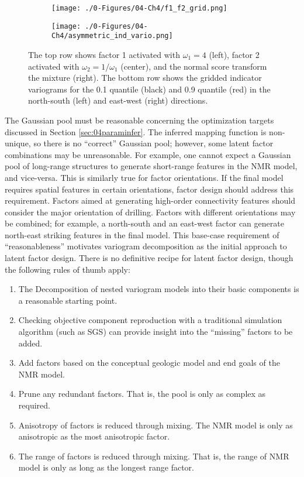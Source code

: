 \begin{figure}[!htb]
    \begin{subfigure}{1.0\textwidth}
        \centering
        \texttt{[image: ./0-Figures/04-Ch4/f1\_f2\_grid.png]}
    \end{subfigure}
    \begin{subfigure}{1.0\textwidth}
        \centering
        \texttt{[image: ./0-Figures/04-Ch4/asymmetric\_ind\_vario.png]}
    \end{subfigure}
    \caption{The top row shows factor 1 activated with $\omega_{1}=4$ (left), factor 2 activated with $\omega_{2}=1/\omega_{1}$ (center), and the normal score transform the mixture (right). The bottom row shows the gridded indicator variograms for the 0.1 quantile (black) and 0.9 quantile (red) in the north-south (left) and east-west (right) directions. }
    \label{fig:pool_asymmetry}
\end{figure}

The Gaussian pool must be reasonable concerning the optimization targets discussed in Section \ref{sec:04paraminfer}. The inferred mapping function is non-unique, so there is no ``correct'' Gaussian pool; however, some latent factor combinations may be unreasonable. For example, one cannot expect a Gaussian pool of long-range structures to generate short-range features in the \gls{NMR} model, and vice-versa. This is similarly true for factor orientations. If the final model requires spatial features in certain orientations, factor design should address this requirement. Factors aimed at generating high-order connectivity features should consider the major orientation of drilling. Factors with different orientations may be combined; for example, a north-south and an east-west factor can generate north-east striking features in the final model. This base-case requirement of ``reasonableness'' motivates variogram decomposition as the initial approach to latent factor design. There is no definitive recipe for latent factor design, though the following rules of thumb apply:
\begin{enumerate}[noitemsep]
    \item The Decomposition of nested variogram models into their basic components is a reasonable starting point.
    \item Checking objective component reproduction with a traditional simulation algorithm (such as \gls{SGS}) can provide insight into the ``missing'' factors to be added.
    \item Add factors based on the conceptual geologic model and end goals of the \gls{NMR} model.
    \item Prune any redundant factors. That is, the pool is only as complex as required.
    \item Anisotropy of factors is reduced through mixing. The \gls{NMR} model is only as anisotropic as the most anisotropic factor.
    \item The range of factors is reduced through mixing. That is, the range of \gls{NMR} model is only as long as the longest range factor.
\end{enumerate}

